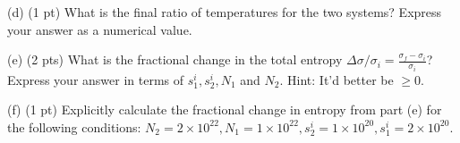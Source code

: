 \documentclass{article}
\theoremstyle{defi}
\begin{document}
\begin{enumerate}
            (d) (1 pt) What is the final ratio of temperatures for the two systems? Express your answer as a numerical value.
                
            (e) (2 pts) What is the fractional change in the total entropy $\Delta \sigma / \sigma_{i}=\frac{\sigma_{f}-\sigma_{i}}{\sigma_{i}}$? Express your answer in terms of $s_1^i, s_2^i, N_1$ and $N_2$. Hint: It'd better be $\geq 0$.
                
            (f) (1 pt) Explicitly calculate the fractional change in entropy from part (e) for the following conditions: $N_{2}=2 \times 10^{22}, N_{1}=1 \times 10^{22}, s_{2}^{i}=1 \times 10^{20}, s_{1}^{i}=2 \times 10^{20}$.
\end{enumerate}
\end{document}
